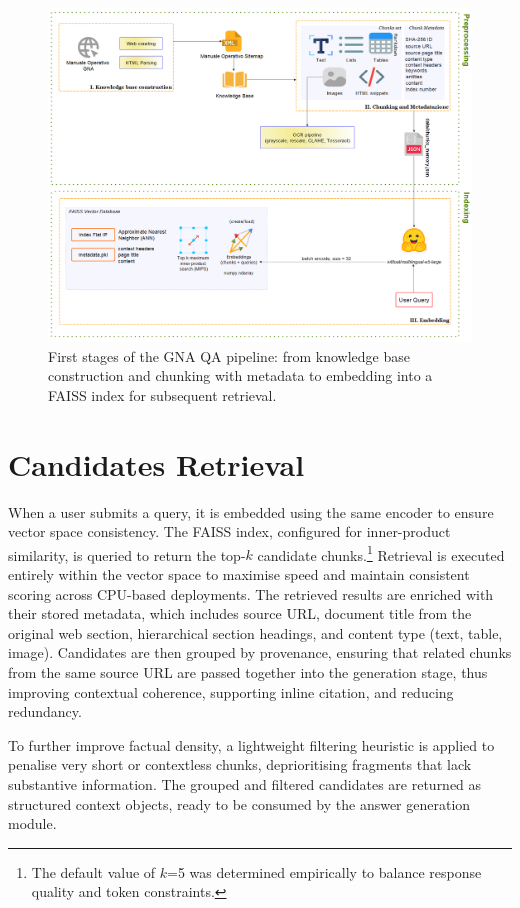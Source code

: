 \begin{spacing}{1.5}
\begin{figure}[H]
  \centering
  \includegraphics[width=\textwidth]{images/preprocess_diagram.png} 
  \caption{First stages of the GNA QA pipeline: from knowledge base construction and chunking with metadata to embedding into a FAISS index for subsequent retrieval.}
  \label{fig:pre}
\end{figure}

\section{Candidates Retrieval}
When a user submits a query, it is embedded using the same encoder to ensure vector space consistency. The FAISS index, configured for inner-product similarity, is queried to return the top-$k$ candidate chunks.\footnote{The default value of $k$=5 was determined empirically to balance response quality and token constraints.} Retrieval is executed entirely within the vector space to maximise speed and maintain consistent scoring across CPU-based deployments. The retrieved results are enriched with their stored metadata, which includes source URL, document title from the original web section, hierarchical section headings, and content type (text, table, image). Candidates are then grouped by provenance, ensuring that related chunks from the same source URL are passed together into the generation stage, thus improving contextual coherence, supporting inline citation, and reducing redundancy.

To further improve factual density, a lightweight filtering heuristic is applied to penalise very short or contextless chunks, deprioritising fragments that lack substantive information. The grouped and filtered candidates are returned as structured context objects, ready to be consumed by the answer generation module. 


\end{spacing}
